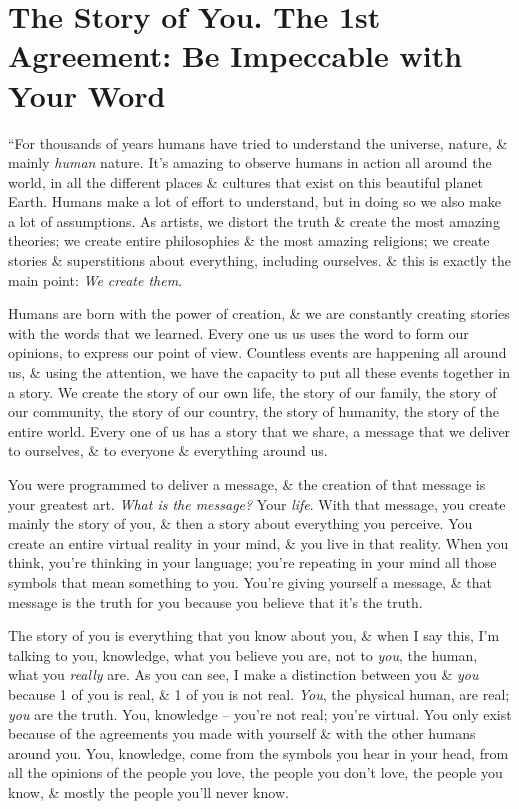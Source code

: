 \documentclass{article}
\numberwithin{equation}{section}
\begin{document}
\section{The Story of You. The 1st Agreement: Be Impeccable with Your Word}
``For thousands of years humans have tried to understand the universe, nature, \& mainly \textit{human} nature. It's amazing to observe humans in action all around the world, in all the different places \& cultures that exist on this beautiful planet Earth. Humans make a lot of effort to understand, but in doing so we also make a lot of assumptions. As artists, we distort the truth \& create the most amazing theories; we create entire philosophies \& the most amazing religions; we create stories \& superstitions about everything, including ourselves. \& this is exactly the main point: \textit{We create them}.

Humans are born with the power of creation, \& we are constantly creating stories with the words that we learned. Every one us us uses the word to form our opinions, to express our point of view. Countless events are happening all around us, \& using the attention, we have the capacity to put all these events together in a story. We create the story of our own life, the story of our family, the story of our community, the story of our country, the story of humanity, the story of the entire world. Every one of us has a story that we share, a message that we deliver to ourselves, \& to everyone \& everything around us.

You were programmed to deliver a message, \& the creation of that message is your greatest art. \textit{What is the message?} Your \textit{life}. With that message, you create mainly the story of you, \& then a story about everything you perceive. You create an entire virtual reality in your mind, \& you live in that reality. When you think, you're thinking in your language; you're repeating in your mind all those symbols that mean something to you. You're giving yourself a message, \& that message is the truth for you because you believe that it's the truth.

The story of you is everything that you know about you, \& when I say this, I'm talking to you, knowledge, what you believe you are, not to \textit{you}, the human, what you \textit{really} are. As you can see, I make a distinction between you \& \textit{you} because 1 of you is real, \& 1 of you is not real. \textit{You}, the physical human, are real; \textit{you} are the truth. You, knowledge -- you're not real; you're virtual. You only exist because of the agreements you made with yourself \& with the other humans around you. You, knowledge, come from the symbols you hear in your head, from all the opinions of the people you love, the people you don't love, the people you know, \& mostly the people you'll never know.
\end{document}
